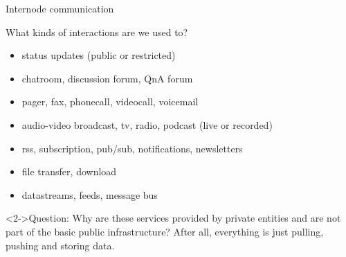 \begin{frame}{Internode communication}
\begin{block}{What kinds of interactions are we used to?}
 \begin{itemize}
    \item status updates (public or restricted)
    \item chatroom, discussion forum, QnA forum
    \item pager, fax, phonecall, videocall, voicemail
    \item audio-video broadcast, tv, radio, podcast (live or recorded)
    \item rss, subscription, pub/sub, notifications, newsletters
    \item file transfer, download
    \item datastreams, feeds, message bus
 \end{itemize}
\end{block}
\begin{block}<2->{Question:}
 Why are these services provided by private entities and are not part of the basic public infrastructure? After all, everything is just pulling, pushing and storing data.
\end{block}
\end{frame}

